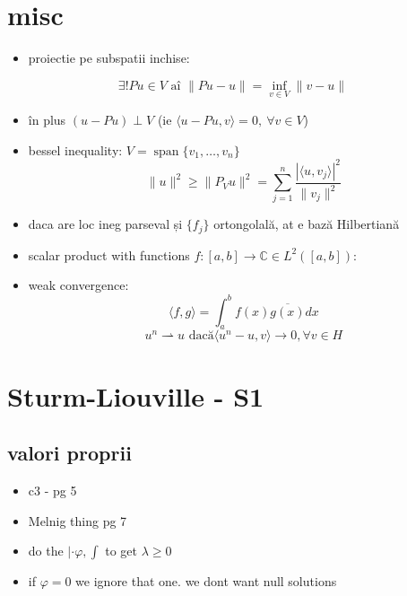 \documentclass[11pt]{article}
\begin{document}
\section*{misc}
\label{sec:org392470e}
\begin{itemize}
\item proiectie pe subspatii inchise:
\end{itemize}
\[ \exists ! Pu \in V  \text{ aî } \| P u - u \|  = \inf_{v \in V} \| v - u \| \]
\begin{itemize}
\item în plus \((u-Pu)\perp V\) (ie \(\langle u-Pu, v \rangle = 0,~ \forall v \in V\))
\end{itemize}
\begin{itemize}
\item bessel inequality: \(V = \operatorname{span} \{ v_1,\ldots, v_n \}\)
\[ \| u\|^2 \geq \|P_V u\|^2 = \sum_{j=1}^n \frac{|\langle u, v_j\rangle|^2}{\|v_j\|^2} \]
\item daca are loc ineg parseval și \(\{f_j\}\) ortongolală, at e bază Hilbertiană
\item scalar product with functions \(f: [a,b] \to \mathbb{C} \in L^2([a, b])\):
\item weak convergence:
\[ \langle f, g\rangle = \int_a^b f(x) \overline{g(x)} dx  \]
\[ u^n \rightharpoonup u \text{ dacă} \langle u^n-u, v\rangle \to 0, \forall v \in H \]
\end{itemize}

\section*{Sturm-Liouville - S1}
\label{sec:org26966ad}
\subsection*{valori proprii}
\label{sec:org9eedb76}
\begin{itemize}
\item c3 - pg 5
\item Melnig thing pg 7

\item do the \(|\cdot \varphi, \int\) to get \(\lambda \geq 0\)
\item if \(\varphi = 0\) we ignore that one. we dont want null solutions
\end{itemize}
\end{document}
